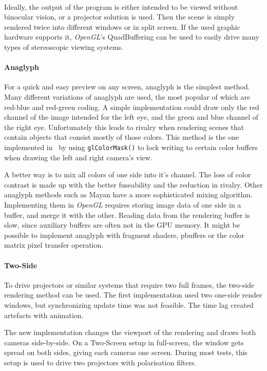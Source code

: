 \paragraph{}
Ideally, the output of the program is either intended to be viewed without binocular vision, or a projector solution is used.
Then the scene is simply rendered twice into different windows or in split screen.
If the used graphic hardware supports it, \textit{OpenGL}'s QuadBuffering can be used to easily drive many types of stereoscopic viewing systems.

\paragraph{Anaglyph}
For a quick and easy preview on any screen, anaglyph is the simplest method.
Many different variations of anaglyph are used, the most popular of which are red-blue and red-green coding.
A simple implementation could draw only the red channel of the image intended for the left eye, and the green and blue channel of the right eye.
Unfortunately this leads to rivalry when rendering scenes that contain objects that consist mostly of those colors.
This method is the one implemented in \ER\ by using \lstinline{glColorMask()} to lock writing to certain color buffers when drawing the left and right camera's view.

A better way is to mix all colors of one side into it's channel.
The loss of color contrast is made up with the better fuseability and the reduction in rivalry.
Other anaglyph methods such as Mayan\cite{Mayan} have a more sophisticated mixing algorithm.
Implementing them in \textit{OpenGL} requires storing image data of one side in a buffer, and merge it with the other.
Reading data from the rendering buffer is slow, since auxiliary buffers are often not in the GPU memory.
It might be possible to implement anaglyph with fragment shaders, pbuffers or the color matrix pixel transfer operation.

\paragraph{Two-Side}
To drive projectors or similar systems that require two full frames, the two-side rendering method can be used.
The first implementation used two one-side render windows, but synchronizing update time was not feasible.
The time lag created artefacts with animation.

The new implementation changes the viewport of the rendering and draws both cameras side-by-side.
On a Two-Screen setup in full-screen, the window gets spread on both sides, giving each cameras one screen.
During most tests, this setup is used to drive two projectors with polarisation filters.

